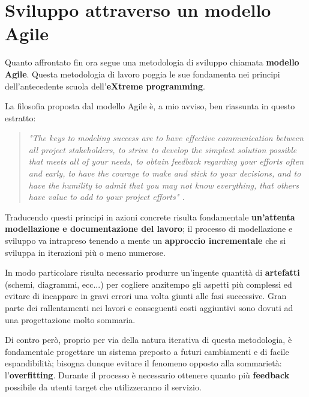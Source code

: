 \vspace{10mm}
\section{Sviluppo attraverso un modello Agile}
Quanto affrontato fin ora segue una metodologia di sviluppo chiamata {\bf modello Agile}.\newline
Questa metodologia di lavoro poggia le sue fondamenta nei principi dell'antecedente scuola dell'{\bf eXtreme programming}.\newline

\noindent La filosofia proposta dal modello Agile è, a mio avviso, ben riassunta in questo estratto:

\begin{quotation}
    \emph{"The keys to modeling success are to have effective communication between all project stakeholders, to strive to develop the simplest solution possible that meets all of your needs, to obtain feedback regarding your efforts often and early, to have the courage to make and stick to your decisions, and to have the humility to admit that you may not know everything, that others have value to add to your project efforts" \cite{agile}.}
\end{quotation}

\noindent Traducendo questi principi in azioni concrete risulta fondamentale {\bf un'attenta modellazione e documentazione del lavoro}; il processo di modellazione e sviluppo va intrapreso tenendo a mente un {\bf approccio incrementale} che si sviluppa in iterazioni più o meno numerose.\newline

\noindent In modo particolare risulta necessario produrre un'ingente quantità di {\bf artefatti} (schemi, diagrammi, ecc...) per cogliere anzitempo gli aspetti più complessi ed evitare di incappare in gravi errori una volta giunti alle fasi successive.\newline
Gran parte dei rallentamenti nei lavori e conseguenti costi aggiuntivi sono dovuti ad una progettazione molto sommaria.\newline

\noindent Di contro però, proprio per via della natura iterativa di questa metodologia, è fondamentale progettare un sistema preposto a futuri cambiamenti e di facile espandibilità; bisogna dunque evitare il fenomeno opposto alla sommarietà: l'{\bf overfitting}.\newline
Durante il processo è necessario ottenere quanto più {\bf feedback} possibile da utenti target che utilizzeranno il servizio.\newline

